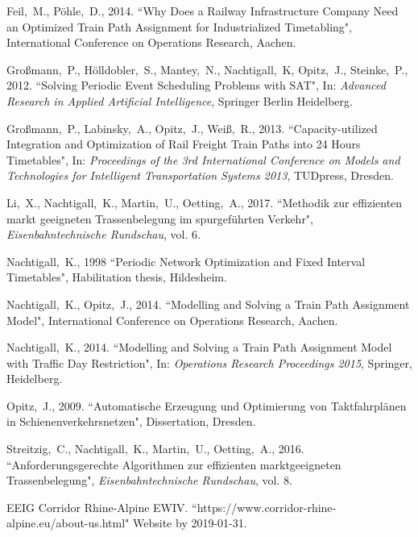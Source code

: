 \documentclass[10pt,a4paper,oneside,onecolumn]{article}
\begin{document}
\begin{thebibliography}{99}
	\setlength{\itemsep}{0\parskip}

	Feil,~M., P\"ohle,~D., 2014.
	{``Why Does a Railway Infrastructure Company Need an Optimized Train Path Assignment for Industrialized Timetabling"},
	International Conference on Operations Research,
	Aachen.

	Gro{\ss}mann,~P., H\"olldobler,~S., Mantey,~N., Nachtigall,~K, Opitz,~J., Steinke,~P., 2012.
	``Solving Periodic Event Scheduling Problems with SAT",
	In: {\em Advanced Research in Applied Artificial Intelligence},
	Springer Berlin Heidelberg.

	Gro{\ss}mann,~P., Labinsky,~A., Opitz,~J., Wei{\ss},~R., 2013.
	``Capacity-utilized Integration and Optimization of Rail Freight Train Paths into 24 Hours Timetables",
	In: {\em Proceedings of the 3rd International Conference on Models and Technologies for Intelligent Transportation Systems 2013},
	TUDpress, Dresden.

	Li,~X., Nachtigall,~K., Martin,~U., Oetting,~A., 2017.
	``Methodik zur effizienten markt geeigneten Trassenbelegung im spurgeführten Verkehr",
	{\em Eisenbahntechnische Rundschau},
	vol. 6.

	Nachtigall,~K., 1998
	{``Periodic Network Optimization and Fixed Interval Timetables"},
	Habilitation thesis,
	Hildesheim.

	Nachtigall,~K., Opitz,~J., 2014.
	{``Modelling and Solving a Train Path Assignment Model"},
	International Conference on Operations Research,
	Aachen.

	Nachtigall,~K., 2014.
	{``Modelling and Solving a Train Path Assignment Model with Traffic Day Restriction"},
	In: {\em Operations Research Proceedings 2015},
	Springer, Heidelberg.

	Opitz,~J., 2009.
	{``Automatische Erzeugung und Optimierung von Taktfahrplänen in Schienenverkehrsnetzen"},
	Dissertation,
	Dresden.

	Streitzig,~C., Nachtigall,~K., Martin,~U., Oetting,~A., 2016.
	``Anforderungsgerechte Algorithmen zur effizienten marktgeeigneten Trassenbelegung",
	{\em Eisenbahntechnische Rundschau},
	vol. 8.

	EEIG Corridor Rhine-Alpine EWIV.
	{``https://www.corridor-rhine-alpine.eu/about-us.html"}
	Website by 2019-01-31.


\end{thebibliography}

\end{document}
